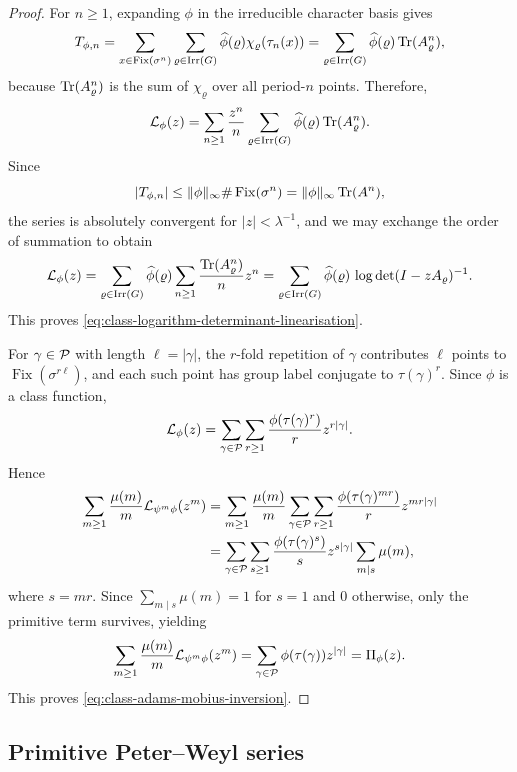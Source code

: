 \begin{proof}
  For \(n\ge 1\), expanding \(\phi\) in the irreducible character basis
  gives
  \[
    T_{\phi,n}
    =\sum_{x\in\operatorname{Fix}(\sigma^n)}
      \sum_{\varrho\in\operatorname{Irr}(G)}
        \widehat\phi(\varrho)\chi_\varrho(\tau_n(x))
    =\sum_{\varrho\in\operatorname{Irr}(G)}
      \widehat\phi(\varrho)\operatorname{Tr}(A_\varrho^n),
  \]
  because \(\operatorname{Tr}(A_\varrho^n)\) is the sum of \(\chi_\varrho\) over all
  period-\(n\) points. Therefore,
  \[
    \mathcal L_\phi(z)
    =\sum_{n\ge 1}\frac{z^n}{n}
      \sum_{\varrho\in\operatorname{Irr}(G)}
        \widehat\phi(\varrho)\operatorname{Tr}(A_\varrho^n).
  \]
  Since
  \[
    \lvert T_{\phi,n} \rvert
    \le \lVert \phi \rVert_\infty \#\operatorname{Fix}(\sigma^n)
    =\lVert \phi \rVert_\infty \operatorname{Tr}(A^n),
  \]
  the series is absolutely convergent for \(|z|<\lambda^{-1}\), and we
  may exchange the order of summation to obtain
  \[
    \mathcal L_\phi(z)
    =
    \sum_{\varrho\in\operatorname{Irr}(G)}
      \widehat\phi(\varrho)
      \sum_{n\ge 1}\frac{\operatorname{Tr}(A_\varrho^n)}{n}z^n
    =
    \sum_{\varrho\in\operatorname{Irr}(G)}
      \widehat\phi(\varrho)\,
      \log\det(I-zA_\varrho)^{-1}.
  \]
  This proves \eqref{eq:class-logarithm-determinant-linearisation}.

  For \(\gamma\in\mathcal P\) with length \(\ell=|\gamma|\), the \(r\)-fold
  repetition of \(\gamma\) contributes \(\ell\) points to
  \(\operatorname{Fix}(\sigma^{r\ell})\), and each such point has group
  label conjugate to \(\tau(\gamma)^r\). Since \(\phi\) is a class
  function,
  \[
    \mathcal L_\phi(z)
    =
    \sum_{\gamma\in\mathcal P}\sum_{r\ge 1}
      \frac{\phi(\tau(\gamma)^r)}{r}z^{r|\gamma|}.
  \]
  Hence
  \begin{align*}
    \sum_{m\ge 1}\frac{\mu(m)}{m}\mathcal L_{\psi^m\phi}(z^m)
    &=
    \sum_{m\ge 1}\frac{\mu(m)}{m}
      \sum_{\gamma\in\mathcal P}\sum_{r\ge 1}
        \frac{\phi(\tau(\gamma)^{mr})}{r}z^{mr|\gamma|} \\
    &=
    \sum_{\gamma\in\mathcal P}\sum_{s\ge 1}
      \frac{\phi(\tau(\gamma)^s)}{s}z^{s|\gamma|}
      \sum_{m\mid s}\mu(m),
  \end{align*}
  where \(s=mr\). Since \(\sum_{m\mid s}\mu(m)=1\) for \(s=1\) and
  \(0\) otherwise, only the primitive term survives, yielding
  \[
    \sum_{m\ge 1}\frac{\mu(m)}{m}\mathcal L_{\psi^m\phi}(z^m)
    =
    \sum_{\gamma\in\mathcal P}\phi(\tau(\gamma))z^{|\gamma|}
    =\Pi_\phi(z).
  \]
  This proves \eqref{eq:class-adams-mobius-inversion}.
\end{proof}

\subsection{Primitive Peter--Weyl series}

